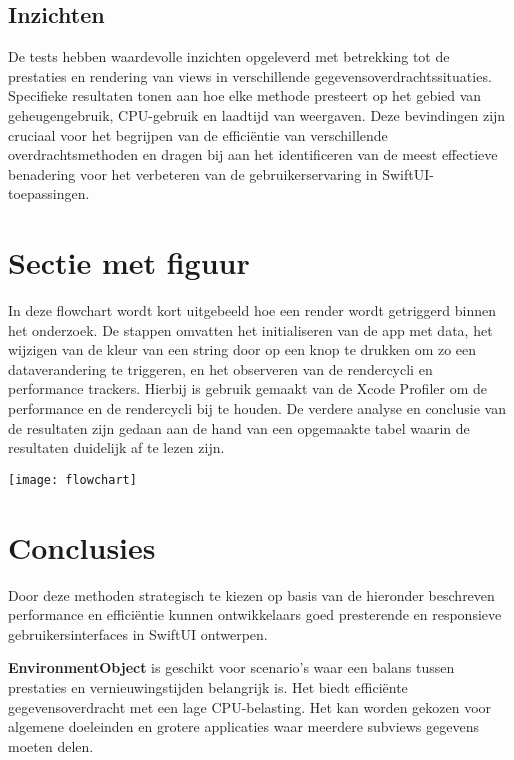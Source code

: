 \documentclass[a0,portrait]{hogent-poster}
\begin{document}
\begin{multicols}{2}
\subsection{Inzichten}
De tests hebben waardevolle inzichten opgeleverd met betrekking tot de prestaties en rendering van views in verschillende gegevensoverdrachtssituaties. Specifieke resultaten tonen aan hoe elke methode presteert op het gebied van geheugengebruik, CPU-gebruik en laadtijd van weergaven. Deze bevindingen zijn cruciaal voor het begrijpen van de efficiëntie van verschillende overdrachtsmethoden en dragen bij aan het identificeren van de meest effectieve benadering voor het verbeteren van de gebruikerservaring in SwiftUI-toepassingen.

\section{Sectie met figuur}
In deze flowchart wordt kort uitgebeeld hoe een render wordt getriggerd binnen het onderzoek. De stappen omvatten het initialiseren van de app met data, het wijzigen van de kleur van een string door op een knop te drukken om zo een dataverandering te triggeren, en het observeren van de rendercycli en performance trackers. Hierbij is gebruik gemaakt van de Xcode Profiler om de performance en de rendercycli bij te houden. De verdere analyse en conclusie van de resultaten zijn gedaan aan de hand van een opgemaakte tabel waarin de resultaten duidelijk af te lezen zijn.
\begin{center}
  \captionsetup{type=figure}
  \texttt{[image: flowchart]}
\end{center}


\section{Conclusies}
Door deze methoden strategisch te kiezen op basis van de hieronder beschreven performance en efficiëntie kunnen ontwikkelaars goed presterende en responsieve gebruikersinterfaces in SwiftUI ontwerpen.\newline

\textbf{EnvironmentObject} is geschikt voor scenario’s waar een balans tussen prestaties en vernieuwingstijden belangrijk is. Het biedt efficiënte gegevensoverdracht met een lage CPU-belasting. Het kan worden gekozen voor algemene doeleinden en grotere applicaties waar meerdere subviews gegevens moeten delen.


\end{multicols}
\end{document}
